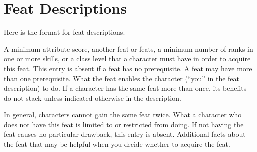 \section{Feat Descriptions}
    Here is the format for feat descriptions.

    \featpre A minimum attribute score, another feat or feats, a minimum number of ranks in one or more skills, or a class level that a character must have in order to acquire this feat.
    This entry is absent if a feat has no prerequisite.
    A feat may have more than one prerequisite.
    \featben What the feat enables the character (``you'' in the feat description) to do.
    If a character has the same feat more than once, its benefits do not stack unless indicated otherwise in the description.
    \par In general, characters cannot gain the same feat twice.
    What a character who does not have this feat is limited to or restricted from doing.
    If not having the feat causes no particular drawback, this entry is absent.
    Additional facts about the feat that may be helpful when you decide whether to acquire the feat.

